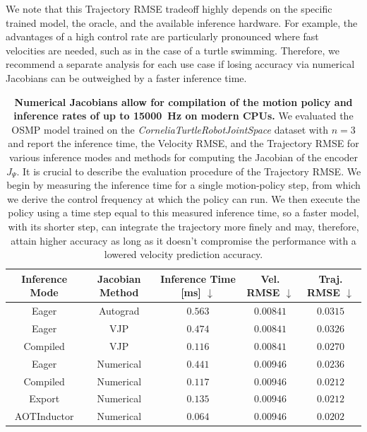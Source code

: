 We note that this Trajectory RMSE tradeoff highly depends on the specific trained model, the oracle, and the available inference hardware. For example, the advantages of a high control rate are particularly pronounced where fast velocities are needed, such as in the case of a turtle swimming. Therefore, we recommend a separate analysis for each use case if losing accuracy via numerical Jacobians can be outweighed by a faster inference time.

\begin{table}
    \centering
    \caption{\textbf{Numerical Jacobians allow for compilation of the motion policy and inference rates of up to \SI{15000}{Hz} on modern CPUs.}
    We evaluated the \gls{OSMP} model trained on the \emph{CorneliaTurtleRobotJointSpace} dataset with $n=3$ and report the inference time, the Velocity RMSE, and the Trajectory \gls{RMSE} for various inference modes and methods for computing the Jacobian of the encoder $J_\Psi$.
    It is crucial to describe the evaluation procedure of the Trajectory \gls{RMSE}. We begin by measuring the inference time for a single motion-policy step, from which we derive the control frequency at which the policy can run. We then execute the policy using a time step equal to this measured inference time, so a faster model, with its shorter step, can integrate the trajectory more finely and may, therefore, attain higher accuracy as long as it doesn't compromise the performance with a lowered velocity prediction accuracy.
    }
    \label{tab:osmp:inference_time_benchmarking} %

    \begin{small}
    \setlength{\tabcolsep}{2.0pt}   %
    \begin{tabular}{cc ccc} %
        \\
        \hline
        \textbf{Inference Mode} & \textbf{Jacobian Method} & \textbf{Inference Time [ms] $\downarrow$} & \textbf{Vel. \gls{RMSE} $\downarrow$} & \textbf{Traj. \gls{RMSE} $\downarrow$}\\
        \hline
        Eager & Autograd & $0.563$ & $\mathbf{0.00841}$ & $0.0315$\\
        Eager & VJP & $0.474$ & $\mathbf{0.00841}$ & $0.0326$\\
        Compiled & VJP & $0.116$ & $\mathbf{0.00841}$ & $0.0270$\\
        Eager & Numerical & $0.441$ & $0.00946$ & $0.0236$\\
        Compiled & Numerical & $0.117$ & $0.00946$ & $0.0212$\\
        Export & Numerical & $0.135$ & $0.00946$ & $0.0212$\\
        AOTInductor & Numerical & $\mathbf{0.064}$ & $0.00946$ & $\mathbf{0.0202}$\\
        \hline
    \end{tabular}
    \end{small}
\end{table}